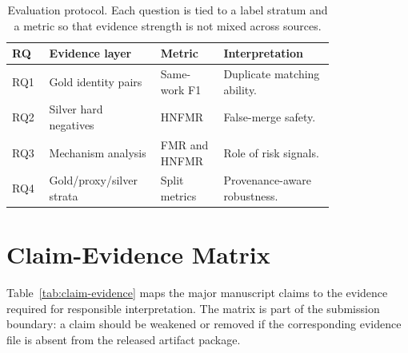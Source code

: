 \documentclass[11pt]{article}
\begin{document}
\begin{table}[H]
\caption{Evaluation protocol. Each question is tied to a label stratum and a metric so that evidence strength is not mixed across sources.}
\label{tab:evaluation-protocol}
\centering
\small
\setlength{\tabcolsep}{3pt}
\begin{tabular}{L{0.08\linewidth}L{0.25\linewidth}L{0.17\linewidth}L{0.30\linewidth}}
\toprule
RQ & Evidence layer & Metric & Interpretation \\
\midrule
RQ1 & Gold identity pairs & Same-work F1 & Duplicate matching ability. \\
RQ2 & Silver hard negatives & HNFMR & False-merge safety. \\
RQ3 & Mechanism analysis & FMR and HNFMR & Role of risk signals. \\
RQ4 & Gold/proxy/silver strata & Split metrics & Provenance-aware robustness. \\
\bottomrule
\end{tabular}
\end{table}

\section{Claim-Evidence Matrix}

Table~\ref{tab:claim-evidence} maps the major manuscript claims to the evidence required for responsible interpretation. The matrix is part of the submission boundary: a claim should be weakened or removed if the corresponding evidence file is absent from the released artifact package.
\end{document}
